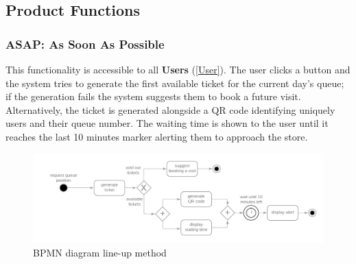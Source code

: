 \documentclass[table, 12pt]{article}
\begin{document}
\begin{flushleft}
    \newpage
    \subsection{Product Functions}
    \label{product_functions}

    \subsubsection{ASAP: As Soon As Possible}
    \label{line_up}
    This functionality is accessible to all \textbf{Users} (\ref{User}). The user clicks a button and the system tries to generate the first available ticket for the current day's queue; if the generation fails the system suggests them to book a future visit.
    Alternatively, the ticket is generated alongside a QR code identifying uniquely users and their queue number. The waiting time is shown to the user until it reaches the last 10 minutes marker alerting them to approach the store.
    \begin{figure}[H]
        \begin{center}
            \includegraphics[scale=0.25]{assets/function-line-up.png}
            \caption{BPMN diagram line-up method}
        \end{center}
    \end{figure}


\end{flushleft}
\end{document}

